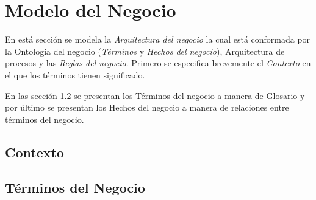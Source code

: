 \section{Modelo del Negocio}	
\label{cap:reqSist}

	En está sección se modela la {\em Arquitectura del negocio} la cual está conformada por la Ontología del negocio ({\em Términos} y {\em Hechos del negocio}), Arquitectura de procesos y las {\em Reglas del negocio}. Primero se especifica brevemente el {\em Contexto} en el que los términos tienen significado.
		
	En las sección \ref{sec:terminosDeNegocio} se presentan los Términos del negocio a manera de Glosario y por último se presentan los Hechos del negocio a manera de relaciones entre términos del negocio.


\subsection{Contexto}

	
	
\subsection{Términos del Negocio}
\label{sec:terminosDeNegocio}

